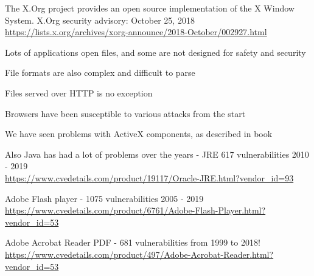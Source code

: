 \documentclass[Screen16to9,17pt]{foils}
\begin{document}
\begin{list2}
\item The X.Org project provides an open source implementation of the X Window System. X.Org security advisory: October 25, 2018
\url{https://lists.x.org/archives/xorg-announce/2018-October/002927.html}

\end{list2}






\begin{list2}
\item Lots of applications open files, and some are not designed for safety and security
\item File formats are also complex and difficult to parse
\item Files served over HTTP is no exception
\item Browsers have been susceptible to various attacks from the start
\item We have seen problems with ActiveX components, as described in book
\item Also Java has had a lot of problems over the years - JRE 617 vulnerabilities 2010 - 2019\\
\url{https://www.cvedetails.com/product/19117/Oracle-JRE.html?vendor_id=93}
\item Adobe Flash player - 1075 vulnerabilities 2005 - 2019\\
\url{https://www.cvedetails.com/product/6761/Adobe-Flash-Player.html?vendor_id=53}
\item Adobe Acrobat Reader PDF - 681 vulnerabilities from 1999 to 2018!\\ \url{https://www.cvedetails.com/product/497/Adobe-Acrobat-Reader.html?vendor_id=53}
\end{list2}

\end{document}
